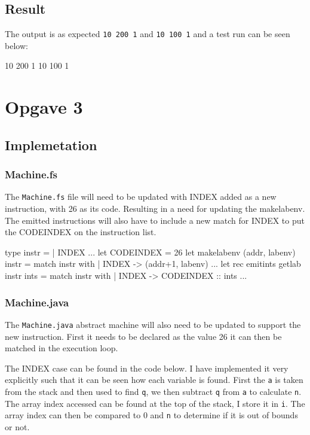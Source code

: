 \subsection{Result}
The output is as expected \texttt{10 200 1} and \texttt{10 100 1} and a test run
can be seen below:
\begin{bashcode}
10 200 1 
10 100 1
\end{bashcode}

\section{Opgave 3}
\subsection{Implemetation}
\subsubsection*{Machine.fs}
The \texttt{Machine.fs} file will need to be updated with INDEX added as a new
instruction, with 26 as its code. Resulting in a need for updating the
makelabenv. The emitted instructions will also have to include a new match for
INDEX to put the CODEINDEX on the instruction list.
\begin{fs}
type instr =
    | INDEX 
...
let CODEINDEX  = 26
let makelabenv (addr, labenv) instr = 
    match instr with
    | INDEX          -> (addr+1, labenv)
...
let rec emitints getlab instr ints = 
    match instr with
    | INDEX          -> CODEINDEX  :: ints
...
\end{fs}
\subsubsection*{Machine.java}
The \texttt{Machine.java} abstract machine will also need to be updated to
support the new instruction. First it needs to be declared as the value 26 it
can then be matched in the execution loop.

The INDEX case can be found in the code below. I have implemented it very
explicitly such that it can be seen how each variable is found. First the
\texttt{a} is taken from the stack and then used to find \texttt{q}, we then
subtract \texttt{q} from \texttt{a} to calculate \texttt{n}. The array index
accessed can be found at the top of the stack, I store it in \texttt{i}. The
array index can then be compared to 0 and \texttt{n} to determine if it is out
of bounds or not. 

